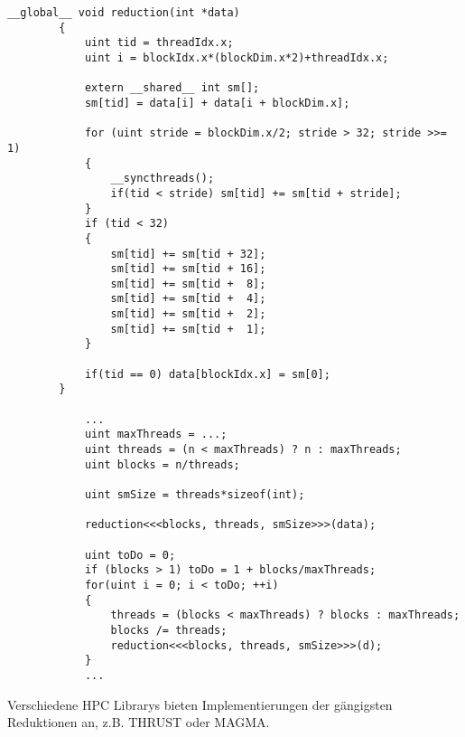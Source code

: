 		\begin{lstlisting}[caption=Reduktion]		
		__global__ void reduction(int *data)
		{
			uint tid = threadIdx.x;
			uint i = blockIdx.x*(blockDim.x*2)+threadIdx.x;

			extern __shared__ int sm[]; 
			sm[tid] = data[i] + data[i + blockDim.x];
  
			for (uint stride = blockDim.x/2; stride > 32; stride >>= 1)
			{
				__syncthreads();
				if(tid < stride) sm[tid] += sm[tid + stride];
			}
			if (tid < 32)
  			{
				sm[tid] += sm[tid + 32];
				sm[tid] += sm[tid + 16];
				sm[tid] += sm[tid +  8];
				sm[tid] += sm[tid +  4];
				sm[tid] += sm[tid +  2];
				sm[tid] += sm[tid +  1];
			}
  
			if(tid == 0) data[blockIdx.x] = sm[0];
		}
		
			...
			uint maxThreads = ...;
			uint threads = (n < maxThreads) ? n : maxThreads;
			uint blocks = n/threads;

			uint smSize = threads*sizeof(int);

			reduction<<<blocks, threads, smSize>>>(data);  

			uint toDo = 0;
			if (blocks > 1) toDo = 1 + blocks/maxThreads;
			for(uint i = 0; i < toDo; ++i)
			{
				threads = (blocks < maxThreads) ? blocks : maxThreads;
				blocks /= threads;
				reduction<<<blocks, threads, smSize>>>(d);
			}
			...
		\end{lstlisting}
		
		Verschiedene HPC Librarys bieten Implementierungen der gängigsten Reduktionen an, z.B. THRUST oder MAGMA. 
		
